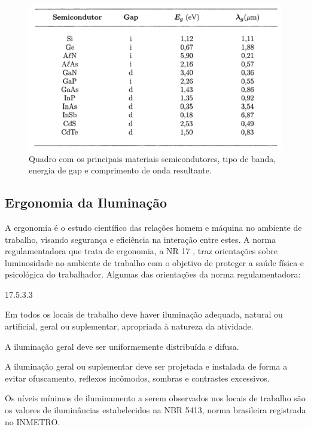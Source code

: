 \begin{figure}[ht]
    \begin{center}
    \includegraphics{figuras/semic.PNG}
    \end{center}
    \caption[Quadro de energias de gap e comprimentos de onda.]{Quadro com os principais materiais semicondutores, tipo de banda, energia de gap e comprimento de onda resultante.}
    \label{semicon}
\end{figure}

\subsection{Ergonomia da Iluminação}

A ergonomia é o estudo científico das relações homem e máquina no ambiente de trabalho, visando segurança e eficiência na interação entre estes. A norma regulamentadora que trata de ergonomia, a NR 17 \cite{norma}, traz orientações sobre luminosidade no ambiente de trabalho com o objetivo de proteger a saúde física e psicológica do trabalhador. Algumas das orientações da norma regulamentadora:

\begin{labeling}{17.5.3.3}
    \item[17.5.3] Em todos os locais de trabalho deve haver iluminação adequada, natural ou artificial, geral ou suplementar, apropriada à natureza da atividade.
    \item[17.5.3.1]  A iluminação geral deve ser uniformemente distribuída e difusa.
    \item[17.5.3.2] A iluminação geral ou suplementar deve ser projetada e instalada de forma a evitar ofuscamento, reflexos incômodos, sombras e contrastes excessivos.
    \item[17.5.3.3] Os níveis mínimos de iluminamento a serem observados nos locais de trabalho são os valores de iluminâncias estabelecidos na NBR 5413, norma brasileira registrada no INMETRO.
\end{labeling}

